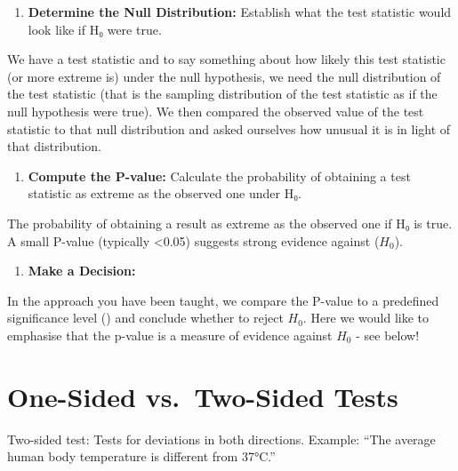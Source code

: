 \documentclass[
  letterpaper,
]{book}
\providecommand{\tightlist}{%
  \setlength{\itemsep}{0pt}\setlength{\parskip}{0pt}}\usepackage{longtable,booktabs,array}
\begin{document}
\begin{enumerate}
\def\labelenumi{\arabic{enumi}.}
\setcounter{enumi}{2}
\tightlist
\item
  \textbf{Determine the Null Distribution:} Establish what the test
  statistic would look like if H₀ were true.
\end{enumerate}

We have a test statistic and to say something about how likely this test
statistic (or more extreme is) under the null hypothesis, we need the
null distribution of the test statistic (that is the sampling
distribution of the test statistic as if the null hypothesis were true).
We then compared the observed value of the test statistic to that null
distribution and asked ourselves how unusual it is in light of that
distribution.

\begin{enumerate}
\def\labelenumi{\arabic{enumi}.}
\setcounter{enumi}{3}
\tightlist
\item
  \textbf{Compute the P-value:} Calculate the probability of obtaining a
  test statistic as extreme as the observed one under H₀.
\end{enumerate}

The probability of obtaining a result as extreme as the observed one if
H₀ is true. A small P-value (typically \textless0.05) suggests strong
evidence against (\(H_0\)).

\begin{enumerate}
\def\labelenumi{\arabic{enumi}.}
\setcounter{enumi}{4}
\tightlist
\item
  \textbf{Make a Decision:}
\end{enumerate}

In the approach you have been taught, we compare the P-value to a
predefined significance level (\alpha) and conclude whether to reject
\(H_0\). Here we would like to emphasise that the p-value is a measure
of evidence against \(H_0\) - see below!

\section*{One-Sided vs.~Two-Sided
Tests}\label{one-sided-vs.-two-sided-tests}


Two-sided test: Tests for deviations in both directions. Example: ``The
average human body temperature is different from 37°C.''
\end{document}
